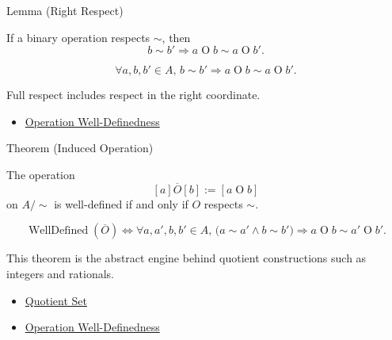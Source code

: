\begin{lemmabox}{Lemma (Right Respect)}
\begin{lemma}
\label{lem:operation-right-respect}
If a binary operation respects $\sim$, then
\[
b\sim b' \Longrightarrow a\mathbin{O}b\sim a\mathbin{O}b'.
\]
\end{lemma}
\end{lemmabox}

\begin{remark*}
\[
\forall a,b,b'\in A,\,
b\sim b' \Rightarrow a\mathbin{O}b\sim a\mathbin{O}b'.
\]
\end{remark*}

\begin{remark*}[Interpretation]
Full respect includes respect in the right coordinate.
\end{remark*}

\begin{dependencies}
\begin{itemize}
  \item \hyperref[def:operation-well-definedness]{Operation Well-Definedness}
\end{itemize}
\end{dependencies}

\begin{theorembox}{Theorem (Induced Operation)}
\begin{theorem}
\label{thm:induced-operation-well-defined}
The operation
\[
[a]\mathbin{\overline{O}}[b]:=[a\mathbin{O}b]
\]
on $A/{\sim}$ is well-defined if and only if $O$ respects $\sim$.
\end{theorem}
\end{theorembox}

\begin{remark*}
\[
\operatorname{WellDefined}(\overline{O})
\Longleftrightarrow
\forall a,a',b,b'\in A,\,
\bigl(a\sim a'\land b\sim b'\bigr)
\Rightarrow
a\mathbin{O}b\sim a'\mathbin{O}b'.
\]
\end{remark*}

\begin{remark*}[Interpretation]
This theorem is the abstract engine behind quotient constructions such as
integers and rationals.
\end{remark*}

\begin{dependencies}
\begin{itemize}
  \item \hyperref[def:quotient-set]{Quotient Set}
  \item \hyperref[def:operation-well-definedness]{Operation Well-Definedness}
\end{itemize}
\end{dependencies}
